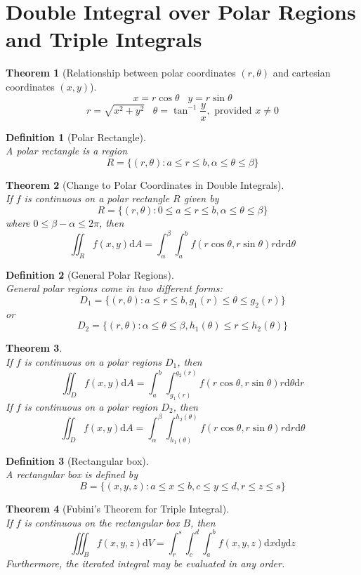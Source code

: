 \documentclass[12pt]{article}
\newtheorem{definition}{Definition}[section]
\newtheorem{theorem}{Theorem}[section]
\theoremstyle{definition}
\newcommand{\diff}{\mathrm{d}}
\begin{document}
\section{Double Integral over Polar Regions and Triple Integrals}
\begin{theorem}[Relationship between polar coordinates $(r,\theta)$ and cartesian coordinates $(x,y)$]
\[
x = r\cos\theta \;\;\; y = r\sin\theta
\]
\[r = \sqrt{x^2+y^2}\;\;\; \theta = \tan^{-1}\frac{y}{x},\text{ provided }x\neq 0
\]
\end{theorem}
\begin{definition}[Polar Rectangle]
\hfill\\\normalfont A polar rectangle is a region
\[
R=\{(r,\theta): a\leq r\leq b, \alpha\leq \theta\leq \beta\}
\]
\end{definition}
\begin{theorem}[Change to Polar Coordinates in Double Integrals]
\hfill\\\normalfont If $f$ is continuous on a polar rectangle $R$ given by
\[
R=\{(r,\theta): 0\leq a\leq r\leq b,\alpha\leq\theta\leq \beta\}
\]
where $0\leq \beta-\alpha\leq 2\pi$, then
\[
\iint_R f(x,y)\diff A = \int_\alpha^\beta\int_a^b f(r\cos\theta, r\sin\theta)r\diff r\diff \theta
\]
\end{theorem}
\begin{definition}[General Polar Regions]
\hfill\\\normalfont General polar regions come in two different forms:
\[
D_1=\{(r,\theta): a\leq r\leq b, g_1(r)\leq \theta\leq g_2(r)\}
\]
or
\[
D_2=\{(r,\theta): \alpha\leq \theta\leq \beta, h_1(\theta)\leq r\leq h_2(\theta)\}
\]
\end{definition}
\begin{theorem}\hfill\\\normalfont If $f$ is continuous on a polar regions $D_1$, then
\[
\iint_D f(x,y)\diff A = \int_a^b\int_{g_1(r)}^{g_2(r)} f(r\cos\theta,r\sin\theta)r\diff\theta\diff r
\]
If $f$ is continuous on a polar region $D_2$, then
\[
\iint_D f(x,y)\diff A = \int_\alpha^\beta\int_{h_1(\theta)}^{h_2(\theta)} f(r\cos\theta,r\sin\theta)r\diff r\diff \theta
\]
\end{theorem}
\begin{definition}[Rectangular box]
\hfill\\\normalfont A rectangular box is defined by
\[
B=\{(x,y,z):a\leq x\leq b, c\leq y\leq d, r\leq z\leq s\}
\]
\end{definition}
\begin{theorem}[Fubini's Theorem for Triple Integral]
\hfill\\\normalfont If $f$ is continuous on the rectangular box $B$, then
\[
\iiint_B f(x,y,z)\diff V = \int_r^s\int_c^d\int_a^b f(x,y,z)\diff x\diff y\diff z
\]
Furthermore, the iterated integral may be evaluated in any order.
\end{theorem}
\clearpage
\end{document}

